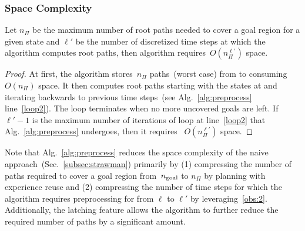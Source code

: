 \documentclass[a4paper]{report}
\begin{document}
\subsubsection{Space Complexity}

\vspace{2mm}
\begin{lemma}
    Let $n_\Pi$ be the maximum number of root paths needed to cover a goal region for a given state \Sstart and $\ell'$ be the number of discretized time steps at which the algorithm computes root paths, then algorithm requires~$O(n_\Pi^{\ell'})$ space.
\end{lemma}
\begin{proof}
 At first, the algorithm stores~$n_\Pi$ paths~(worst case) from \Shome to \Gfull consuming~$O(n_\Pi)$ space. It then computes root paths starting with the states at \Trc and iterating backwards to previous time steps~(see Alg.~\ref{alg:preprocess} line~\ref{loop2}). The loop terminates when no more uncovered goals are left. If~$\ell' - 1$ is the maximum number of iterations of loop at line~\ref{loop2} that Alg.~\ref{alg:preprocess} undergoes, then it requires ~$O(n_\Pi^{\ell'})$ space.
\end{proof}

Note that Alg.~\ref{alg:preprocess} reduces the space complexity of the naive approach~(Sec.~\ref{subsec:strawman}) primarily by (1) compressing the number of paths required to cover a goal region from~$n_{\rm goal}$ to $n_\Pi$ by planning with experience reuse and (2) compressing the number of time steps for which the algorithm requires preprocessing for from $\ell$ to $\ell'$ by leveraging~\ref{obs:2}.
%
Additionally, the latching feature allows the algorithm to further reduce the required number of paths by a significant amount.
\end{document}
